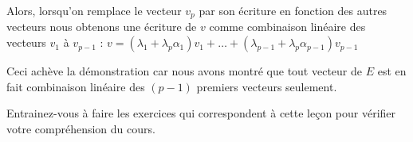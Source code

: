 \change
Alors, lorsqu'on remplace le vecteur $v_p$ par son écriture en fonction des autres vecteurs 
nous obtenons une écriture de $v$ comme combinaison linéaire des vecteurs $v_1$ à $v_{p-1}$ :
$v=\left ( \lambda_1+\lambda_{p}\alpha_1\right )v_1+\dots + 
 \left ( \lambda_{p-1}+\lambda_{p}\alpha_{p-1}\right )v_{p-1}$

Ceci achève la démonstration car nous avons montré que tout vecteur de $E$ est en fait combinaison linéaire des $(p-1)$ premiers vecteurs seulement.



\diapo
Entrainez-vous à faire les exercices qui correspondent à cette le\c{c}on pour vérifier votre compréhension du cours.


